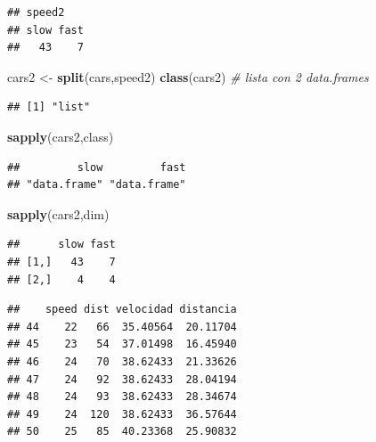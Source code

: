 \documentclass[
]{book}
\newenvironment{Shaded}{\begin{snugshade}}{\end{snugshade}}
\newcommand{\CommentTok}[1]{\textcolor[rgb]{0.56,0.35,0.01}{\textit{#1}}}
\newcommand{\FunctionTok}[1]{\textcolor[rgb]{0.13,0.29,0.53}{\textbf{#1}}}
\newcommand{\NormalTok}[1]{#1}
\newcommand{\OtherTok}[1]{\textcolor[rgb]{0.56,0.35,0.01}{#1}}
\newcommand{\SpecialCharTok}[1]{\textcolor[rgb]{0.81,0.36,0.00}{\textbf{#1}}}
\begin{document}
\begin{verbatim}
## speed2
## slow fast 
##   43    7
\end{verbatim}

\begin{Shaded}
\begin{Highlighting}[]
\NormalTok{cars2 }\OtherTok{\textless{}{-}} \FunctionTok{split}\NormalTok{(cars,speed2)}
\FunctionTok{class}\NormalTok{(cars2) }\CommentTok{\# lista con 2 data.frames}
\end{Highlighting}
\end{Shaded}

\begin{verbatim}
## [1] "list"
\end{verbatim}

\begin{Shaded}
\begin{Highlighting}[]
\FunctionTok{sapply}\NormalTok{(cars2,class)}
\end{Highlighting}
\end{Shaded}

\begin{verbatim}
##         slow         fast 
## "data.frame" "data.frame"
\end{verbatim}

\begin{Shaded}
\begin{Highlighting}[]
\FunctionTok{sapply}\NormalTok{(cars2,dim)}
\end{Highlighting}
\end{Shaded}

\begin{verbatim}
##      slow fast
## [1,]   43    7
## [2,]    4    4
\end{verbatim}

\begin{Shaded}
\end{Shaded}

\begin{verbatim}
##    speed dist velocidad distancia
## 44    22   66  35.40564  20.11704
## 45    23   54  37.01498  16.45940
## 46    24   70  38.62433  21.33626
## 47    24   92  38.62433  28.04194
## 48    24   93  38.62433  28.34674
## 49    24  120  38.62433  36.57644
## 50    25   85  40.23368  25.90832
\end{verbatim}
\end{document}
